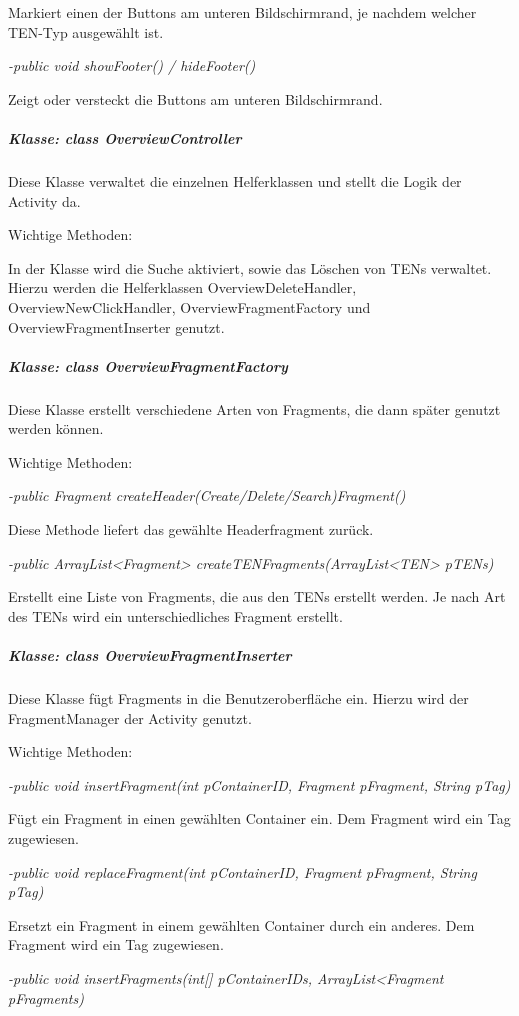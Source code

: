Markiert einen der Buttons am unteren Bildschirmrand, je nachdem welcher TEN-Typ ausgewählt ist.

\textit{-public void showFooter() / hideFooter()}

Zeigt oder versteckt die Buttons am unteren Bildschirmrand.

\subparagraph*{Klasse: class OverviewController}

Diese Klasse verwaltet die einzelnen Helferklassen und stellt die Logik der Activity da. 

Wichtige Methoden:

In der Klasse wird die Suche aktiviert, sowie das Löschen von TENs verwaltet. Hierzu werden die Helferklassen OverviewDeleteHandler, OverviewNewClickHandler, OverviewFragmentFactory und OverviewFragmentInserter genutzt. 

\subparagraph*{Klasse: class OverviewFragmentFactory}

Diese Klasse erstellt verschiedene Arten von Fragments, die dann später genutzt werden können.

Wichtige Methoden:

\textit{-public Fragment createHeader(Create/Delete/Search)Fragment()}

Diese Methode liefert das gewählte Headerfragment zurück.

\textit{-public ArrayList<Fragment> createTENFragments(ArrayList<TEN> pTENs)}

Erstellt eine Liste von Fragments, die aus den TENs erstellt werden. Je nach Art des TENs wird ein unterschiedliches Fragment erstellt.

\subparagraph*{Klasse: class OverviewFragmentInserter}

Diese Klasse fügt Fragments in die Benutzeroberfläche ein. Hierzu wird der FragmentManager der Activity genutzt.

Wichtige Methoden:

\textit{-public void insertFragment(int pContainerID, Fragment pFragment, String pTag)}

Fügt ein Fragment in einen gewählten Container ein. Dem Fragment wird ein Tag zugewiesen.

\textit{-public void replaceFragment(int pContainerID, Fragment pFragment, String pTag)}

Ersetzt ein Fragment in einem gewählten Container durch ein anderes. Dem Fragment wird ein Tag zugewiesen.

\textit{-public void insertFragments(int[] pContainerIDs, ArrayList<Fragment pFragments)}

